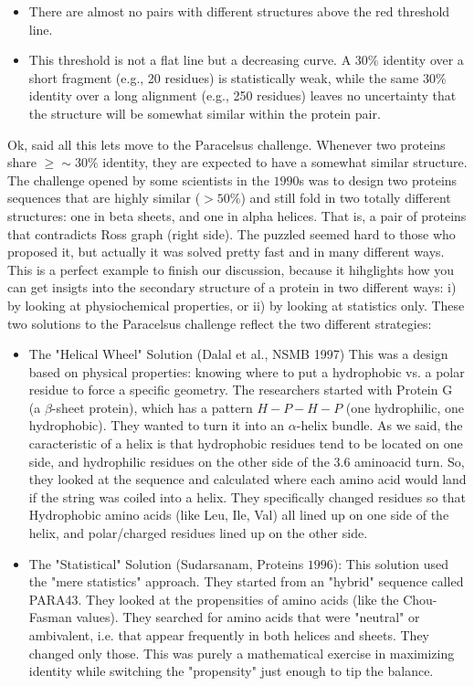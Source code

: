 \begin{itemize}
    \item There are almost no pairs with different structures above the red threshold line. 
    \item This threshold is not a flat line but a decreasing curve. A $30\%$ identity over a short fragment (e.g., 20 residues) is statistically weak, while the same $30\%$ identity over a long alignment (e.g., 250 residues) leaves no uncertainty that the structure will be somewhat similar within the protein pair.
\end{itemize}



Ok, said all this lets move to the Paracelsus challenge.
Whenever two proteins share $\geq \sim 30\%$ identity, they are expected to have a somewhat similar structure. The challenge opened by some scientists
in the $1990$s was to design two proteins sequences that are highly similar ($>50\%$) and still fold in two totally different structures: one in beta sheets, and 
one in alpha helices. That is, a pair of proteins that contradicts Ross graph (right side). The puzzled seemed hard to those who proposed it, but actually it was solved
pretty fast and in many different ways. This is a perfect example to finish our discussion, because it hihglights how you can get insigts into the secondary
structure of a protein in two different ways: i) by looking at physiochemical properties, or ii) by looking at statistics only. 
These two solutions to the Paracelsus challenge reflect the two different strategies:
\begin{itemize}
\item The "Helical Wheel" Solution (Dalal et al., NSMB 1997) This was a design based on physical properties: knowing where to put a hydrophobic vs. a polar residue to force a specific geometry.
The researchers started with Protein G (a $\beta$-sheet protein), which has a pattern $H-P-H-P$ (one hydrophilic, one hydrophobic). They wanted to turn it into an $\alpha$-helix bundle. As we said, the caracteristic of a helix is that hydrophobic residues tend to be located on one side, and hydrophilic residues on the other side of the $3.6$
aminoacid turn. So, they looked at the sequence and calculated where each amino acid would land if the string was coiled into a helix. They specifically changed residues so that Hydrophobic amino acids (like Leu, Ile, Val) all lined up on one side of the helix, and polar/charged residues lined up on the other side.

\item The "Statistical" Solution (Sudarsanam, Proteins $1996$):  This solution used the "mere statistics" approach. They started from an "hybrid" sequence called PARA43.
They looked at the propensities of amino acids (like the Chou-Fasman values). They searched for amino acids that were "neutral" or ambivalent, i.e. that appear frequently in both helices and sheets.
They changed only those. This was purely a mathematical exercise in maximizing identity while switching the "propensity" just enough to tip the balance.
\end{itemize}


